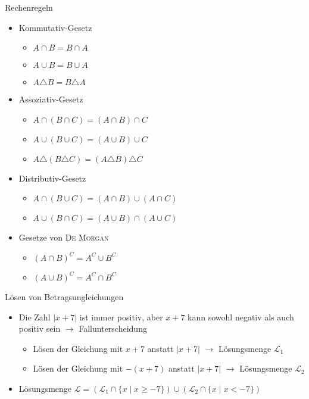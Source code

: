 \documentclass[10pt,landscape,a4paper]{article}
\begin{document}
\begin{multicols*}{4}
Rechenregeln
\begin{itemize}
	\item Kommutativ-Gesetz
	\begin{itemize}
		\item $A\cap B = B\cap A$
		\item $A\cup B = B\cup A$
		\item $A\triangle B = B\triangle A$
	\end{itemize}
	\item Assoziativ-Gesetz
	\begin{itemize}
		\item $A \cap (B \cap C) = (A \cap B) \cap C$
		\item $A \cup (B \cup C) = (A \cup B) \cup C$
		\item $A \triangle (B \triangle C) = (A \triangle B) \triangle C$
	\end{itemize}
	\item Distributiv-Gesetz
	\begin{itemize}
		\item $A \cap (B \cup C) = (A\cap B) \cup (A \cap C)$
		\item $A \cup (B \cap C) = (A\cup B) \cap (A \cup C)$
	\end{itemize}
	\item Gesetze von \textsc{De Morgan}
	\begin{itemize}
		\item $(A \cap B)^C = A^C \cup B^C$
		\item $(A \cup B)^C = A^C \cap B^C$
	\end{itemize}
\end{itemize}
Lösen von Betragsungleichungen
\begin{itemize}
	\item Die Zahl $\vert x+7\vert$ ist immer positiv, aber $x+7$ kann sowohl negativ als auch positiv sein $\to$ Fallunterscheidung
	\begin{itemize}
		\item Lösen der Gleichung mit $x+7$ anstatt $\vert x+7\vert$ $\to$ Lösungsmenge $\mathcal{L}_1$
		\item Lösen der Gleichung mit $-(x+7)$ anstatt $\vert x+7\vert$ $\to$ Lösungsmenge $\mathcal{L}_2$
	\end{itemize}
	\item Lösungsmenge $\mathcal{L} = (\mathcal{L}_1\cap \{x\mid x\ge -7\}) \cup (\mathcal{L}_2\cap \{x\mid x < -7\})$
\end{itemize}


\end{multicols*}
\end{document}
